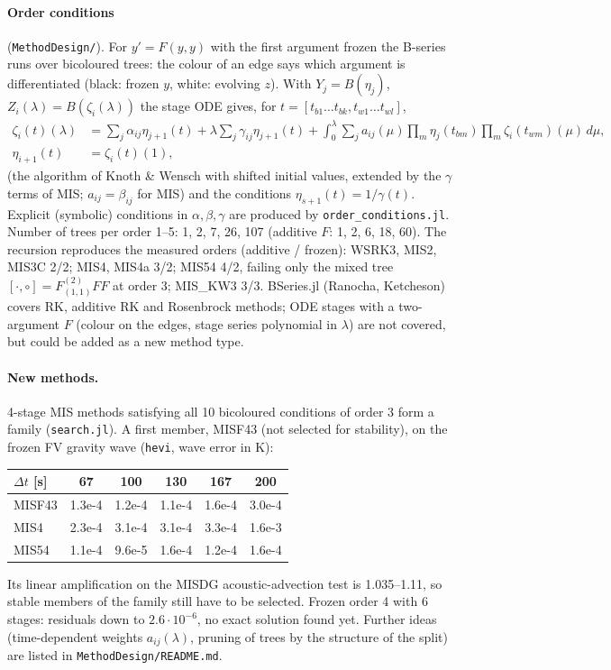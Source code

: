 \documentclass[11pt,a4paper]{article}
\newcommand{\code}[1]{\texttt{#1}}
\newcommand{\dt}{\Delta t}
\begin{document}
\paragraph{Order conditions} (\code{MethodDesign/}). For $y'=F(y,y)$ with the first argument frozen
the B-series runs over bicoloured trees: the colour of an edge says which argument is
differentiated (black: frozen $y$, white: evolving $z$). With $Y_j=B(\eta_j)$, $Z_i(\lambda)=B(\zeta_i(\lambda))$
the stage ODE gives, for $t=[t_{b1}\dots t_{bk},t_{w1}\dots t_{wl}]$,
\begin{align*}
\zeta_i(t)(\lambda)&=\sum_j\alpha_{ij}\eta_{j+1}(t)+\lambda\sum_j\gamma_{ij}\eta_{j+1}(t)
+\int_0^\lambda\sum_j a_{ij}(\mu)\prod_m\eta_j(t_{bm})\prod_m\zeta_i(t_{wm})(\mu)\,d\mu,\\
\eta_{i+1}(t)&=\zeta_i(t)(1),
\end{align*}
(the algorithm of Knoth \& Wensch with shifted initial values, extended by the $\gamma$ terms of MIS;
$a_{ij}=\beta_{ij}$ for MIS) and the conditions $\eta_{s+1}(t)=1/\gamma(t)$. Explicit (symbolic)
conditions in $\alpha,\beta,\gamma$ are produced by \code{order\_conditions.jl}. Number of trees per
order 1--5: 1, 2, 7, 26, 107 (additive $F$: 1, 2, 6, 18, 60). The recursion reproduces the measured
orders (additive / frozen): WSRK3, MIS2, MIS3C 2/2; MIS4, MIS4a 3/2; MIS54 4/2, failing only the
mixed tree $[\cdot,\circ]=F^{(2)}_{(1,1)}FF$ at order 3; MIS\_KW3 3/3. BSeries.jl (Ranocha,
Ketcheson) covers RK, additive RK and Rosenbrock methods; ODE stages with a two-argument $F$
(colour on the edges, stage series polynomial in $\lambda$) are not covered, but could be added as a
new method type.

\paragraph{New methods.} 4-stage MIS methods satisfying all 10 bicoloured conditions of order 3 form
a family (\code{search.jl}). A first member, MISF43 (not selected for stability), on the frozen FV
gravity wave (\code{hevi}, wave error in K):
\begin{center}
\begin{tabular}{lccccc}
\toprule
$\dt$ [s] & 67 & 100 & 130 & 167 & 200\\
\midrule
MISF43 & 1.3e-4 & 1.2e-4 & 1.1e-4 & 1.6e-4 & 3.0e-4\\
MIS4 & 2.3e-4 & 3.1e-4 & 3.1e-4 & 3.3e-4 & 1.6e-3\\
MIS54 & 1.1e-4 & 9.6e-5 & 1.6e-4 & 1.2e-4 & 1.6e-4\\
\bottomrule
\end{tabular}
\end{center}
Its linear amplification on the MISDG acoustic-advection test is 1.035--1.11, so stable members of
the family still have to be selected. Frozen order 4 with 6 stages: residuals down to $2.6\cdot10^{-6}$,
no exact solution found yet. Further ideas (time-dependent weights $a_{ij}(\lambda)$, pruning of
trees by the structure of the split) are listed in \code{MethodDesign/README.md}.
\end{document}
